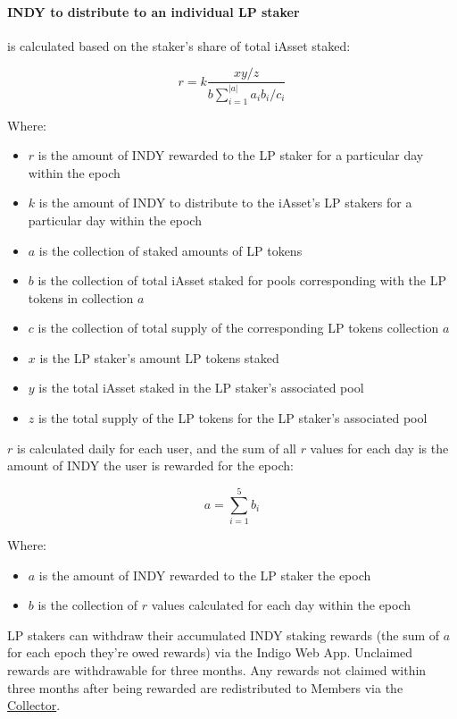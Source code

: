 \documentclass{article}
\begin{document}
\begin{sloppypar}
\hypertarget{indy-to-distribute-to-an-individual-lp-staker}{%
\paragraph{INDY to distribute to an individual LP
staker}\label{indy-to-distribute-to-an-individual-lp-staker}}

is calculated based on the staker's share of total iAsset staked:

\[r=k\frac{xy/z}{b\sum_{i=1}^{\left| a \right|}a_{i}b_{i}/c_{i}}\]

Where:

\begin{itemize}
\item
  \(r\) is the amount of INDY rewarded to the LP staker for a particular
  day within the epoch
\item
  \(k\) is the amount of INDY to distribute to the iAsset's LP stakers
  for a particular day within the epoch
\item
  \(a\) is the collection of staked amounts of LP tokens
\item
  \(b\) is the collection of total iAsset staked for pools corresponding
  with the LP tokens in collection \(a\)
\item
  \(c\) is the collection of total supply of the corresponding LP tokens
  collection \(a\)
\item
  \(x\) is the LP staker's amount LP tokens staked
\item
  \(y\) is the total iAsset staked in the LP staker's associated pool
\item
  \(z\) is the total supply of the LP tokens for the LP staker's
  associated pool
\end{itemize}

\(r\) is calculated daily for each user, and the sum of all \(r\) values
for each day is the amount of INDY the user is rewarded for the epoch:

\[a = \sum_{i = 1}^{5}b_{i}\]

Where:

\begin{itemize}
\item
  \(a\) is the amount of INDY rewarded to the LP staker the epoch
\item
  \(b\) is the collection of \(r\) values calculated for each day within
  the epoch
\end{itemize}

LP stakers can withdraw their accumulated INDY staking rewards (the sum
of \(a\) for each epoch they're owed rewards) via the Indigo Web App.
Unclaimed rewards are withdrawable for three months. Any rewards not
claimed within three months after being rewarded are redistributed to
Members via the \protect\hyperlink{protocol-profit-sharing}{Collector}.


\end{sloppypar}
\end{document}
